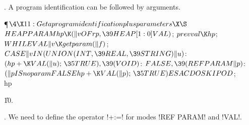 . A program identification can be followed by arguments.

\Y\P$\4\X11:Get a program identification plus parameters\X\S$\6
$\\{HEAP}\\{PARAM}\\{hp}\K(\|v\\{OF}\\{rp},\39\\{HEAP}[1:0]\\{VAL})$;\5
$\\{prev}\\{val}\K\\{hp}$;\5
$\\{WHILE}\\{VAL}\|v\K\\{get}\\{param}(\|f)$;\6
\4$\\{CASE}\|v\\{IN}(\\{UNION}(\\{INT},\39\\{REAL},\39\\{STRING})\|u)$: $(%
\\{hp}+\K\\{VAL}(\|u);\,\35\\{TRUE}),\39(\\{VOID})$: $\\{FALSE},\39(\\{REF}%
\\{PARAM}\|p)$: $(\|p\\{IS}\\{no}\\{param}\\{FALSE}\\{hp}+\K\\{VAL}(\|p);\,%
\35\\{TRUE})\\{ESAC}\\{DO}\\{SKIP}\\{OD}$;\5
\\{hp}\par
\U10.\fi

. We need to define the operator !+:=! for modes !REF PARAM! and
!VAL!.


